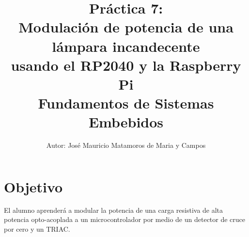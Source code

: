 \documentclass[letterpaper,10.5pt]{article}
\author{\footnotesize Autor: José Mauricio Matamoros de Maria y Campos}
\title{Práctica 7:\\Modulación de potencia de una lámpara incandecente\\usando el RP2040 y la Raspberry Pi\\
{\large Fundamentos de Sistemas Embebidos}}
\date{}
\begin{document}
\maketitle

\section{Objetivo}%
\label{sec:objective}
El alumno aprenderá a modular la potencia de una carga resistiva de alta potencia opto-acoplada a un microcontrolador por medio de un detector de cruce por cero y un TRIAC.



\cleardoublepage




\appendix


\end{document}
